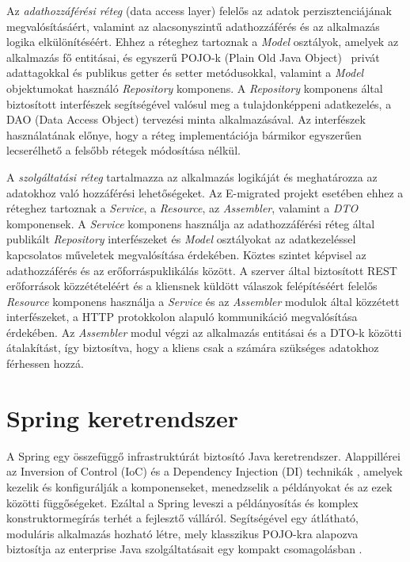 Az \textit{adathozzáférési réteg} (data access layer) felelős az adatok perzisztenciájának megvalósításáért, valamint az alacsonyszintű adathozzáférés és az alkalmazás logika elkülönítéséért. Ehhez a réteghez tartoznak a \textit{Model} osztályok, amelyek az alkalmazás fő entitásai, és egyszerű POJO-k (Plain Old Java Object)~\cite{POJO} privát adattagokkal és publikus getter és setter metódusokkal, valamint a \textit{Model} objektumokat használó \textit{Repository} komponens. A \textit{Repository} komponens  által biztosított interfészek segítségével valósul meg a tulajdonképpeni adatkezelés, a DAO (Data Access Object)\cite{DAO} tervezési minta alkalmazásával. Az interfészek használatának előnye, hogy a réteg implementációja bármikor egyszerűen lecserélhető a felsőbb rétegek módosítása nélkül. 

A \textit{szolgáltatási réteg} tartalmazza az alkalmazás logikáját és meghatározza az adatokhoz való hozzáférési lehetőségeket. Az E-migrated projekt esetében ehhez a réteghez tartoznak a \textit{Service}, a \textit{Resource}, az \textit{Assembler}, valamint a \textit{DTO} komponensek. A \textit{Service} komponens használja az adathozzáférési réteg által publikált \textit{Repository} interfészeket és \textit{Model} osztályokat az adatkezeléssel kapcsolatos műveletek megvalósítása érdekében. Köztes szintet képvisel az adathozzáférés és az erőforráspuklikálás között. A szerver által biztosított REST erőforrások közzétételéért és a kliensnek küldött válaszok felépítéséért felelős \textit{Resource} komponens használja a  \textit{Service} és az \textit{Assembler} modulok által közzétett interfészeket, a HTTP protokkolon alapuló kommunikáció megvalósítása érdekében. Az \textit{Assembler} modul végzi az alkalmazás entitásai és a DTO-k közötti átalakítást, így biztosítva, hogy a kliens csak a számára szükséges adatokhoz férhessen hozzá. 




\section{Spring keretrendszer}
\label{subsec:Spring}

A Spring egy összefüggő infrastruktúrát biztosító Java keretrendszer.  Alappillérei az Inversion of Control (IoC) és a Dependency Injection (DI) technikák \cite{IoCDI}, amelyek kezelik és konfigurálják a komponenseket, menedzselik a példányokat és az ezek közötti függőségeket. Ezáltal a Spring leveszi a példányosítás és komplex konstruktormegírás terhét a fejlesztő válláról. Segítségével egy átlátható, moduláris alkalmazás hozható létre, mely klasszikus POJO-kra alapozva biztosítja az enterprise Java szolgáltatásait egy kompakt csomagolásban \cite{Spring}. 

